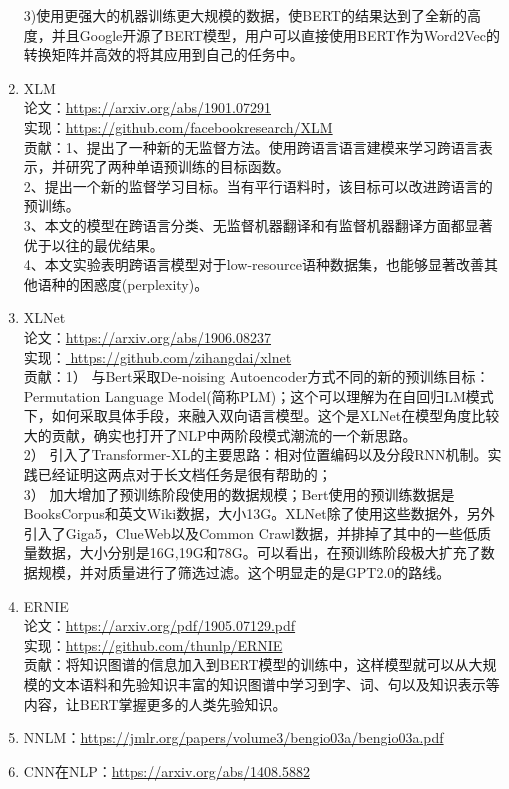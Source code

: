 \documentclass[lang=cn,11pt,a4paper]{eleganttemplate}
\begin{document}
\begin{enumerate}
    3)使用更强大的机器训练更大规模的数据，使BERT的结果达到了全新的高度，并且Google开源了BERT模型，用户可以直接使用BERT作为Word2Vec的转换矩阵并高效的将其应用到自己的任务中。
    \item XLM \\
    论文：\href{https://arxiv.org/abs/1901.07291}{https://arxiv.org/abs/1901.07291}  \\
    实现：\href{https://github.com/facebookresearch/XLM}{https://github.com/facebookresearch/XLM}  \\
    贡献：1、提出了一种新的无监督方法。使用跨语言语言建模来学习跨语言表示，并研究了两种单语预训练的目标函数。\\
    2、提出一个新的监督学习目标。当有平行语料时，该目标可以改进跨语言的预训练。\\
    3、本文的模型在跨语言分类、无监督机器翻译和有监督机器翻译方面都显著优于以往的最优结果。\\
    4、本文实验表明跨语言模型对于low-resource语种数据集，也能够显著改善其他语种的困惑度(perplexity)。
    \item XLNet \\
    论文：\href{https://arxiv.org/abs/1906.08237}{https://arxiv.org/abs/1906.08237}  \\
    实现：\href{ https://github.com/zihangdai/xlnet}{ https://github.com/zihangdai/xlnet} \\
    贡献：1） 与Bert采取De-noising Autoencoder方式不同的新的预训练目标：Permutation Language Model(简称PLM)；这个可以理解为在自回归LM模式下，如何采取具体手段，来融入双向语言模型。这个是XLNet在模型角度比较大的贡献，确实也打开了NLP中两阶段模式潮流的一个新思路。\\
    2） 引入了Transformer-XL的主要思路：相对位置编码以及分段RNN机制。实践已经证明这两点对于长文档任务是很有帮助的；\\
    3） 加大增加了预训练阶段使用的数据规模；Bert使用的预训练数据是BooksCorpus和英文Wiki数据，大小13G。XLNet除了使用这些数据外，另外引入了Giga5，ClueWeb以及Common Crawl数据，并排掉了其中的一些低质量数据，大小分别是16G,19G和78G。可以看出，在预训练阶段极大扩充了数据规模，并对质量进行了筛选过滤。这个明显走的是GPT2.0的路线。
    \item ERNIE \\
    论文：\href{https://arxiv.org/pdf/1905.07129.pdf}{https://arxiv.org/pdf/1905.07129.pdf}  \\
    实现：\href{https://github.com/thunlp/ERNIE}{https://github.com/thunlp/ERNIE}  \\
    贡献：将知识图谱的信息加入到BERT模型的训练中，这样模型就可以从大规模的文本语料和先验知识丰富的知识图谱中学习到字、词、句以及知识表示等内容，让BERT掌握更多的人类先验知识。
    \item NNLM：\href{https://jmlr.org/papers/volume3/bengio03a/bengio03a.pdf}{https://jmlr.org/papers/volume3/bengio03a/bengio03a.pdf} 
	\item CNN在NLP：\href{https://arxiv.org/abs/1408.5882}{https://arxiv.org/abs/1408.5882}  
\end{enumerate}
\end{document}
